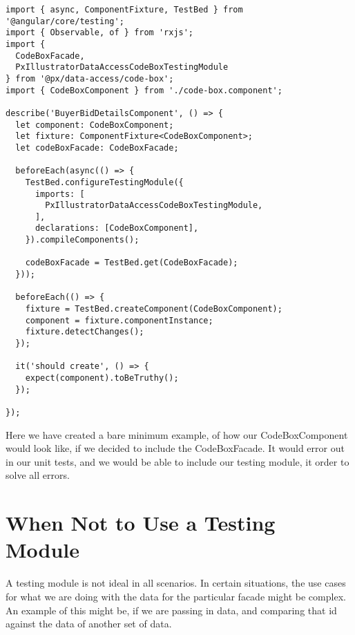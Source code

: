 \begin{lstlisting}
import { async, ComponentFixture, TestBed } from '@angular/core/testing';
import { Observable, of } from 'rxjs';
import {
  CodeBoxFacade,
  PxIllustratorDataAccessCodeBoxTestingModule
} from '@px/data-access/code-box';
import { CodeBoxComponent } from './code-box.component';

describe('BuyerBidDetailsComponent', () => {
  let component: CodeBoxComponent;
  let fixture: ComponentFixture<CodeBoxComponent>;
  let codeBoxFacade: CodeBoxFacade;

  beforeEach(async(() => {
    TestBed.configureTestingModule({
      imports: [
        PxIllustratorDataAccessCodeBoxTestingModule,
      ],
      declarations: [CodeBoxComponent],
    }).compileComponents();

    codeBoxFacade = TestBed.get(CodeBoxFacade);
  }));

  beforeEach(() => {
    fixture = TestBed.createComponent(CodeBoxComponent);
    component = fixture.componentInstance;
    fixture.detectChanges();
  });

  it('should create', () => {
    expect(component).toBeTruthy();
  });

});

\end{lstlisting}

Here we have created a bare minimum example, of how our CodeBoxComponent would
look like, if we decided to include the CodeBoxFacade. It would error out in
our unit tests, and we would be able to include our testing module, it order to
solve all errors.

\section{ When Not to Use a Testing Module }
A testing module is not ideal in all scenarios. In certain situations, the
use cases for what we are doing with the data for the particular facade might
be complex. An example of this might be, if we are passing in data, and
comparing that id against the data of another set of data.
